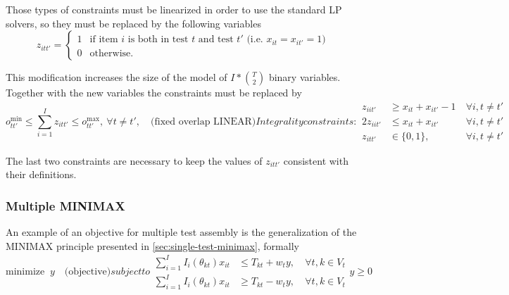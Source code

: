 Those types of constraints must be linearized in order to use the standard LP solvers, so they must be replaced by the following variables
\begin{equation*}\label{eq:Mmod:Mol}
z_{itt'}=
\begin{cases}
1 & \mbox{if item }i \mbox{ is both in test }t \mbox{ and test } t' \mbox{ (i.e. }x_{it}=x_{it'}=1 \mbox{)} \\

0 & \mbox{otherwise}.


\end{cases}
\end{equation*}

This modification increases the size of the model of $I*{{T}\choose{2}}$ binary variables.
Together with the new variables the constraints must be replaced by
\begin{subequations}[resume]
	\begin{equation}	\label{eq:Mmod:MOL}
	o^{\min}_{tt'} \le \sum_{i=1}^I{z_{itt'}} \le o^{\max}_{tt'}, \ \forall t \neq t', \quad \mbox{(fixed overlap LINEAR)}
	\end{equation}
	Integrality constraints:
	\begin{alignat}{2}
	\label{eq:Mmod:Mic1}
	z_{iit'} & \ge x_{it}+x_{it'}-1 \ & \forall i,t \neq t'\\
	\label{eq:Mmod:Mic2}
	2 z_{iit'} & \le x_{it}+x_{it'} \ & \forall i,t \neq t'\\
	\nonumber
	z_{itt'} & \in \{0,1\}, \ & \forall i,t \neq t' 	
	\end{alignat}
	
\end{subequations}

The last two constraints are necessary to keep the values of $z_{itt'}$ consistent with their definitions.
\subsubsection{Multiple MINIMAX}
An example of an objective for multiple test assembly is the generalization of the MINIMAX principle presented in \ref{sec:single-test-minimax}, formally
\begin{subequations}
	\begin{equation}
	\mbox{minimize } \ y \quad \mbox{(objective)}
	\end{equation}
	subject to
	\begin{alignat}{2}
	\label{eq:MMINIMAX1}
	\sum_{i=1}^I I_i(\theta_{kt}) x_{it} & \le T_{kt} + w_ty, \ & \forall t,k \in V_t\\
	\label{eq:MMINIMAX2}
	\sum_{i=1}^I I_i(\theta_{kt}) x_{it} & \ge T_{kt} - w_ty, \ & \forall t,k \in V_t
	\end{alignat}
	\begin{equation*}
	y \ge 0
	\end{equation*}
	\label{eq:MMINIMAX}
\end{subequations}

